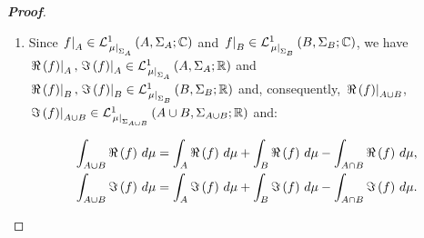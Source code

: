 \begin{proposition}
\begin{proof}[\rm\textbf{Proof}]
\begin{enumerate}
      \begin{equation}
        \begin{split}
          \,\,& \int_{X}{\pr{\alpha\cdot f+\beta\cdot g}\,d\mu}\\
          =\,\, & \int_{X}{\pr{a\cdot u-b\cdot v+c\cdot u'-d\cdot v'}\,d\mu}+\int_{X}{\pr{b\cdot u+a\cdot v+c\cdot v'+d\cdot u'}\,d\mu}\cdot i\\
          =\,\, & \pr{a\cdot\int_{X}{u\,d\mu}-b\cdot\int_{X}{v\,d\mu}+c\cdot\int_{X}{u'\,d\mu}-d\cdot\int_{X}{v'\,d\mu}}\\
          +\,\, & \pr{b\cdot\int_{X}{u\,d\mu}+a\cdot\int_{X}{v\,d\mu}+c\cdot\int_{X}{v'\,d\mu}+d\cdot\int_{X}{u'\,d\mu}}\cdot i\\
          =\,\, & \pr{a\cdot\int_{X}{u\,d\mu}-b\cdot\int_{X}{v\,d\mu}}+\pr{b\cdot\int_{X}{u\,d\mu}+a\cdot\int_{X}{v\,d\mu}}\cdot i\\
          +\,\, & \pr{c\cdot\int_{X}{u'\,d\mu}-d\cdot\int_{X}{v'\,d\mu}}+\pr{d\cdot\int_{X}{u'\,d\mu}+c\cdot\int_{X}{v'\,d\mu}}\cdot i\\
          =\,\, & \pr{a+b\cdot i}\cdot\pr{\int_{X}{u\,d\mu}+\int_{X}{v\,d\mu}\cdot i} +\pr{c+d\cdot i}\cdot\pr{\int_{X}{u'\,d\mu}+\int_{X}{v'\,d\mu}\cdot i}\\
          =\,\, & \alpha\cdot\int_{X}{f\,d\mu}+\beta\cdot\int_{X}{g\,d\mu}.
        \end{split}
      \end{equation}
      \item Since $\rest{f}{A}\in\LebC{A}{\Sigma_A}{\rest{\mu}{\Sigma_A}}$ and $\rest{f}{B}\in\LebC{B}{\Sigma_{B}}{\rest{\mu}{\Sigma_B}}$, we have $\rest{\Re\pr{f}}{A},\rest{\Im\pr{f}}{A}\in\LebR{A}{\Sigma_A}{\rest{\mu}{\Sigma_A}}$ and $\rest{\Re\pr{f}}{B},\rest{\Im\pr{f}}{B}\in\LebR{B}{\Sigma_{B}}{\rest{\mu}{\Sigma_B}}$ and, consequently, $\rest{\Re\pr{f}}{A\cup B}$, $\rest{\Im\pr{f}}{A\cup B}\in\LebR{A\cup B}{\Sigma_{A\cup B}}{\rest{\mu}{\Sigma_{A\cup B}}}$ and:
      
      \begin{equation}
        \begin{split}
          \int_{A\cup B}{\Re\pr{f}\,d\mu}=\int_{A}{\Re\pr{f}\,d\mu}+\int_{B}{\Re\pr{f}\,d\mu}-\int_{A\cap B}{\Re\pr{f}\,d\mu},\\
          \int_{A\cup B}{\Im\pr{f}\,d\mu}=\int_{A}{\Im\pr{f}\,d\mu}+\int_{B}{\Im\pr{f}\,d\mu}-\int_{A\cap B}{\Im\pr{f}\,d\mu}.
        \end{split}
      \end{equation}


\end{enumerate}
\end{proof}
\end{proposition}
